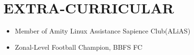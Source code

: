 \documentclass[letterpaper,11pt]{article}
\newcommand{\achievementItem}[1]{
  \item\small{
    {#1 \vspace{-6pt}}
  }
}
\begin{document}
\section{EXTRA-CURRICULAR}

\begin{itemize}[leftmargin=0.2in]

  \achievementItem{Member of Amity Linux Assistance Sapience Club(ALiAS)}
  \achievementItem{Zonal-Level Football Champion, BBFS FC}

\end{itemize}
\end{document}
